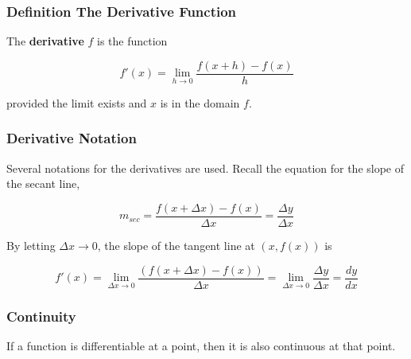 \documentclass{report}
\begin{document}
\subsubsection{Definition The Derivative Function}
The \textbf{derivative} $f$ is the function

\begin{equation*}
    f'(x)=\lim_{h \to 0} \frac{f(x+h)-f(x)}{h}
\end{equation*}

provided the limit exists and $x$ is in the domain $f$.


\newpage

\subsubsection{Derivative Notation}
Several notations for the derivatives are used. Recall the equation for the slope of the secant line,

\begin{equation*}
    m_{sec}=\frac{f(x + \Delta x)-f(x)}{\Delta x} = \frac{\Delta y}{\Delta x}
\end{equation*}

By letting $\Delta x \to 0$, the slope of the tangent line at $(x,f(x))$ is 

\begin{equation*}
    f'(x)=\lim_{\Delta x \to 0} \frac{(f(x+ \Delta x)- f(x))}{\Delta x}= \lim_{\Delta x \to 0} \frac{\Delta y}{\Delta x }= \frac{dy}{dx}
\end{equation*}

\subsubsection{Continuity}
If a function is differentiable at a point, then it is also continuous at that point.
\end{document}
